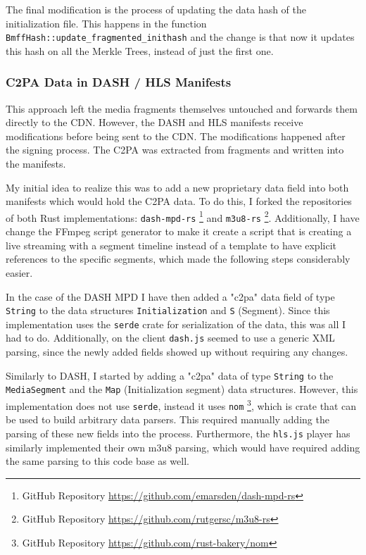 The final modification is the process of updating the data hash of the initialization file. This happens in the function \texttt{BmffHash::update\_fragmented\_inithash} and the change is that now it updates this hash on all the Merkle Trees, instead of just the first one.

\subsubsection{C2PA Data in DASH / HLS Manifests\label{sec:in_manifest}}

This approach left the media fragments themselves untouched and forwards them directly to the CDN. However, the DASH and HLS manifests receive modifications before being sent to the CDN. The modifications happened after the signing process. The C2PA was extracted from fragments and written into the manifests.

My initial idea to realize this was to add a new proprietary data field into both manifests which would hold the C2PA data. To do this, I forked the repositories of both Rust implementations: \texttt{dash-mpd-rs} \footnote{GitHub Repository \url{https://github.com/emarsden/dash-mpd-rs}} and \texttt{m3u8-rs} \footnote{GitHub Repository \url{https://github.com/rutgersc/m3u8-rs}}. Additionally, I have change the FFmpeg script generator to make it create a script that is creating a live streaming with a segment timeline instead of a template to have explicit references to the specific segments, which made the following steps considerably easier.

In the case of the DASH MPD I have then added a "c2pa" data field of type \texttt{String} to the data structures \texttt{Initialization} and \texttt{S} (Segment). Since this implementation uses the \texttt{serde} crate for serialization of the data, this was all I had to do. Additionally, on the client \texttt{dash.js} seemed to use a generic XML parsing, since the newly added fields showed up without requiring any changes.

Similarly to DASH, I started by adding a "c2pa" data of type \texttt{String} to the \texttt{MediaSegment} and the \texttt{Map} (Initialization segment) data structures. However, this implementation does not use \texttt{serde}, instead it uses \texttt{nom} \footnote{GitHub Repository \url{https://github.com/rust-bakery/nom}}, which is crate that can be used to build arbitrary data parsers. This required manually adding the parsing of these new fields into the process. Furthermore, the \texttt{hls.js} player has similarly implemented their own m3u8 parsing, which would have required adding the same parsing to this code base as well.

